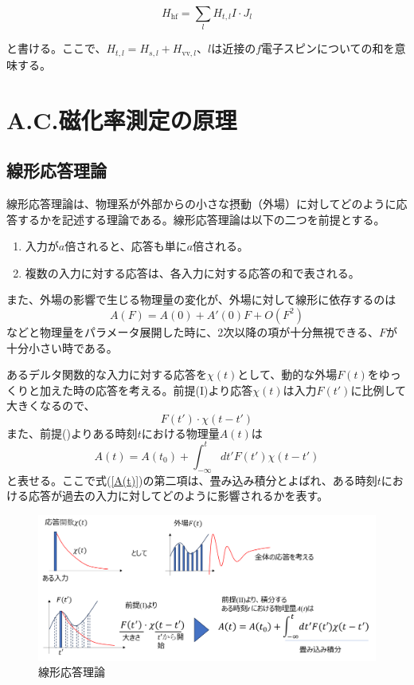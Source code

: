 \documentclass[11pt,a4j]{jreport}
\begin{document}
\begin{equation}
H_{\text{hf}} = \sum_{l} H_{t, l} I \cdot J_l
\end{equation}

と書ける。ここで、$H_{t, l} = H_{s, l} + H_{\text{vv}, l}$、$l$は近接の$f$電子スピンについての和を意味する。

\chapter{A.C.磁化率測定の原理}
\section{線形応答理論}
線形応答理論は、物理系が外部からの小さな摂動（外場）に対してどのように応答するかを記述する理論である。線形応答理論は以下の二つを前提とする。
\begin{enumerate}[label=\textnormal{(\Roman*)}]
  \item 入力が$a$倍されると、応答も単に$a$倍される。
  \item 複数の入力に対する応答は、各入力に対する応答の和で表される。
\end{enumerate}
また、外場の影響で生じる物理量の変化が、外場に対して線形に依存するのは
\begin{equation}
  A(F)=A(0)+A'(0)F+O(F^2)
\end{equation}
などと物理量をパラメータ展開した時に、2次以降の項が十分無視できる、$F$が十分小さい時である。\par
あるデルタ関数的な入力に対する応答を$\chi(t)$として、動的な外場$F(t)$をゆっくりと加えた時の応答を考える。前提(I)より応答$\chi(t)$は入力$F(t')$に比例して大きくなるので、
\begin{equation}
  F(t')\cdot\chi(t-t')
\end{equation}
また、前提()よりある時刻$t$における物理量$A(t)$は
\begin{equation}
 A(t)=A(t_0)+\int_{-\infty}^{t}{dt'F(t') \chi(t-t')}
 \label{A(t)}
\end{equation}
と表せる。ここで式(\ref{A(t)})の第二項は、畳み込み積分とよばれ、ある時刻$t$における応答が過去の入力に対してどのように影響されるかを表す。
\begin{figure}[htbp]
  \centering
  \vspace{10mm}
  \includegraphics[width=160mm]{./figure/liner_theory.png}
  \caption{線形応答理論}
  \label{liner_theroy}
\end{figure}
\end{document}
